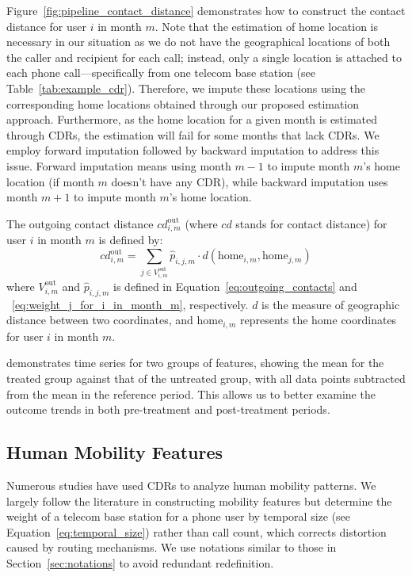 Figure~\ref{fig:pipeline_contact_distance} demonstrates how to construct the contact distance for user $i$ in month $m$.
Note that the estimation of home location is necessary in our situation as we do not have the geographical locations of both the caller and recipient for each call; instead, only a single location is attached to each phone call---specifically from one telecom base station (see Table~\ref{tab:example_cdr}).
Therefore, we impute these locations using the corresponding home locations obtained through our proposed estimation approach.
Furthermore, as the home location for a given month is estimated through CDRs, the estimation will fail for some months that lack CDRs.
We employ forward imputation followed by backward imputation to address this issue. Forward imputation means using month $m-1$ to impute month $m$'s home location (if month $m$ doesn't have any CDR), while backward imputation uses month $m+1$ to impute month $m$'s home location.

\begin{definition}
The outgoing contact distance \( cd^{\text{out}}_{i, m} \) (where $cd$ stands for contact distance) for user $i$ in month $m$ is defined by:
\[
cd^{\text{out}}_{i, m}
=
\sum_{j \in V^{\text{out}}_{i, m} } \hat{p}_{i, j, m}
\cdot
d(\text{home}_{i, m}, \text{home}_{j, m})
\]
where $V^{\text{out}}_{i, m}$ and $\hat{p}_{i, j, m}$ is defined in Equation~\ref{eq:outgoing_contacts} and ~\ref{eq:weight_j_for_i_in_month_m}, respectively. $d$ is the measure of geographic distance between two coordinates, and $\text{home}_{i, m}$ represents the home coordinates for user $i$ in month $m$.
\end{definition}

 demonstrates time series for two groups of features, showing the mean for the treated group against that of the untreated group, with all data points subtracted from the mean in the reference period. This allows us to better examine the outcome trends in both pre-treatment and post-treatment periods.


\subsection{Human Mobility Features}
Numerous studies have used CDRs to analyze human mobility patterns. We largely follow the literature in constructing mobility features but determine the weight of a telecom base station for a phone user by temporal size (see Equation~\ref{eq:temporal_size}) rather than call count, which corrects distortion caused by routing mechanisms. We use notations similar to those in Section~\ref{sec:notations} to avoid redundant redefinition.

